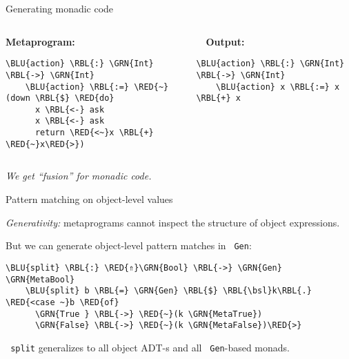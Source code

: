 \documentclass[dvipsnames,aspectratio=169]{beamer}
\theoremstyle{remark}
\newcommand{\RED}[1]{{\color{BrickRed} #1}}
\newcommand{\GRN}[1]{{\color{OliveGreen} #1}}
\newcommand{\RBL}[1]{{\color{RoyalBlue} #1}}
\newcommand{\BLU}[1]{{\color{Blue} #1}}
\newcommand{\bsl}{\textbackslash}
\begin{document}
\begin{frame}[fragile]{Generating monadic code}

\begin{columns}
\begin{column}{0.4\textwidth}
\textbf{Metaprogram:}
\begin{Verbatim}[commandchars=\\\{\}]
    \BLU{action} \RBL{:} \GRN{Int} \RBL{->} \GRN{Int}
    \BLU{action} \RBL{:=} \RED{~}(down \RBL{$} \RED{do}
      x \RBL{<-} ask
      x \RBL{<-} ask
      return \RED{<~}x \RBL{+} \RED{~}x\RED{>})
\end{Verbatim}
\end{column}

\begin{column}{0.5\textwidth}
\textbf{$\hspace{1em}$Output:}
\begin{Verbatim}[commandchars=\\\{\}]
    \BLU{action} \RBL{:} \GRN{Int} \RBL{->} \GRN{Int}
    \BLU{action} x \RBL{:=} x \RBL{+} x



\end{Verbatim}
\end{column}
\end{columns}
\vspace{2em}

\emph{We get ``fusion'' for monadic code.}

\end{frame}

\begin{frame}[fragile]{Pattern matching on object-level values}

\emph{Generativity:} metaprograms cannot inspect the structure of object expressions.
\vspace{1em}

But we can generate object-level pattern matches in \texttt{\GRN{Gen}}:
\vspace{0.5em}
\begin{Verbatim}[commandchars=\\\{\}]
    \BLU{split} \RBL{:} \RED{⇑}\GRN{Bool} \RBL{->} \GRN{Gen} \GRN{MetaBool}
    \BLU{split} b \RBL{=} \GRN{Gen} \RBL{$} \RBL{\bsl}k\RBL{.} \RED{<case ~}b \RED{of}
      \GRN{True } \RBL{->} \RED{~}(k \GRN{MetaTrue})
      \GRN{False} \RBL{->} \RED{~}(k \GRN{MetaFalse})\RED{>}
\end{Verbatim}

\vspace{1em}
\texttt{\BLU{split}} generalizes to all object ADT-s and all \texttt{\GRN{Gen}}-based monads.

\end{frame}
\end{document}

